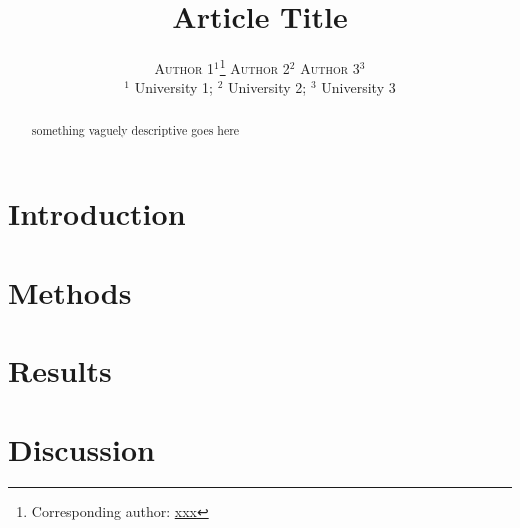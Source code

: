 \documentclass[twoside,twocolumn]{article}\usepackage[]{graphicx}\usepackage[]{color}
\title{Article Title} %
\author{%
\textsc{Author 1}$^1$\thanks{Corresponding author: \href{mailto:xxx}{xxx}}\hspace{2em}
\textsc{Author 2}$^2$\hspace{2em}
\textsc{Author 3}$^3$\\[1ex] %
{\footnotesize
$^1$ University 1;
$^2$ University 2;
$^3$ University 3
} %
}
\date{} %
\begin{document}
\maketitle
\begin{abstract}
\noindent something vaguely descriptive goes here
\end{abstract}

\section{Introduction}


\section{Methods}



\section{Results}


\section{Discussion}





\end{document}
